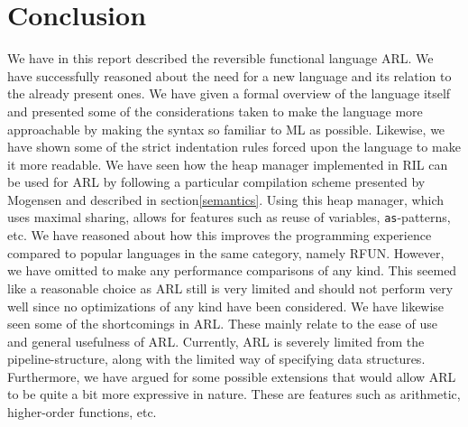 \documentclass[a4paper]{article}
\begin{document}
\section{Conclusion}
\label{sec:orgcb8821f}
We have in this report described the reversible functional language ARL. We have successfully reasoned about the need for a new language and its relation to the already present ones. We have given a formal overview of the language itself and presented some of the considerations taken to make the language more approachable by making the syntax so familiar to ML as possible. Likewise, we have shown some of the strict indentation rules forced upon the language to make it more readable. We have seen how the heap manager implemented in RIL can be used for ARL by following a particular compilation scheme presented by Mogensen\cite{patterns} and described in section\ref{semantics}. Using this heap manager, which uses maximal sharing, allows for features such as reuse of variables, \texttt{as}-patterns, etc. We have reasoned about how this improves the programming experience compared to popular languages in the same category, namely RFUN. However, we have omitted to make any performance comparisons of any kind. This seemed like a reasonable choice as ARL still is very limited and should not perform very well since no optimizations of any kind have been considered. We have likewise seen some of the shortcomings in ARL. These mainly relate to the ease of use and general usefulness of ARL. Currently, ARL is severely limited from the pipeline-structure, along with the limited way of specifying data structures. Furthermore, we have argued for some possible extensions that would allow ARL to be quite a bit more expressive in nature. These are features such as arithmetic, higher-order functions, etc.
\end{document}
